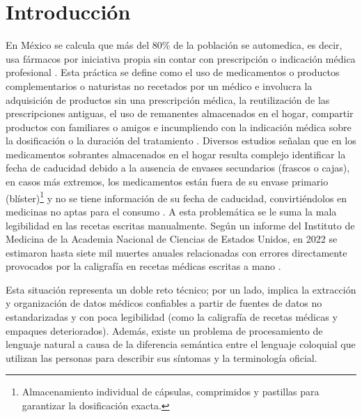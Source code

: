 \setcounter{page}{1}
\pagestyle{fancy}

\section{Introducción}%

En México se calcula que más del 80\% de la población se automedica, es decir, usa fármacos por iniciativa propia sin contar con prescripción o indicación médica profesional \cite{SecSalud}. Esta práctica se define como el uso de medicamentos o productos complementarios o naturistas no recetados por un médico e involucra la adquisición de productos sin una prescripción médica, la reutilización de las prescripciones antiguas, el uso de remanentes almacenados en el hogar, compartir productos con familiares o amigos e incumpliendo con la indicación médica sobre la dosificación o la duración del tratamiento \cite{ugto}. Diversos estudios señalan que en los medicamentos sobrantes almacenados en el hogar resulta complejo identificar la fecha de caducidad debido a la ausencia de envases secundarios (frascos o cajas), en casos más extremos, los medicamentos están fuera de su envase primario (blíster)\footnote{Almacenamiento individual de cápsulas, comprimidos y pastillas para garantizar la dosificación exacta.} y no se tiene información de su fecha de caducidad, convirtiéndolos en medicinas no aptas para el consumo \cite{ResMedicamentos}. A esta problemática se le suma la mala legibilidad en las recetas escritas manualmente. Según un informe del Instituto de Medicina de la Academia Nacional de Ciencias de Estados Unidos, en 2022 se estimaron hasta siete mil muertes anuales relacionadas con errores directamente provocados por la caligrafía en recetas médicas escritas a mano \cite{elsoldedurango}.

Esta situación representa un doble reto técnico; por un lado, implica la extracción y organización de datos médicos confiables a partir de fuentes de datos no estandarizadas y con poca legibilidad (como la caligrafía de recetas médicas y empaques deteriorados). Además, existe un problema de procesamiento de lenguaje natural a causa de la diferencia semántica entre el lenguaje coloquial que utilizan las personas para describir sus síntomas y la terminología oficial.

